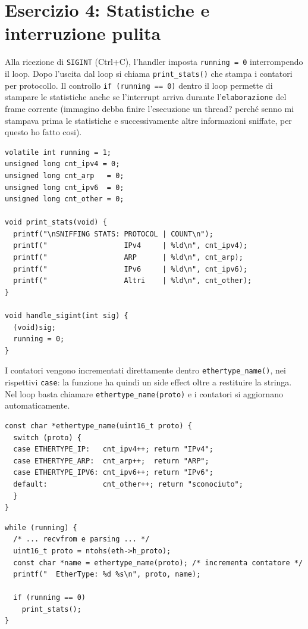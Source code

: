 \documentclass[a4paper,12pt]{article}
\begin{document}
\section{Esercizio 4: Statistiche e interruzione pulita}

Alla ricezione di \texttt{SIGINT} (Ctrl+C), l'handler imposta \texttt{running = 0}
interrompendo il loop. Dopo l'uscita dal loop si chiama \texttt{print\_stats()} che
stampa i contatori per protocollo. Il controllo \texttt{if (running == 0)} dentro il
loop permette di stampare le statistiche anche se l'interrupt arriva durante
l'\texttt{elaborazione} del frame corrente (immagino debba finire l'esecuzione
un thread? perché senno mi stampava prima le statistiche e successivamente
altre informazioni sniffate, per questo ho fatto cosi).

\begin{lstlisting}[caption={Variabili globali, handler e print\_stats()}]
volatile int running = 1;
unsigned long cnt_ipv4 = 0;
unsigned long cnt_arp   = 0;
unsigned long cnt_ipv6  = 0;
unsigned long cnt_other = 0;

void print_stats(void) {
  printf("\nSNIFFING STATS: PROTOCOL | COUNT\n");
  printf("                  IPv4     | %ld\n", cnt_ipv4);
  printf("                  ARP      | %ld\n", cnt_arp);
  printf("                  IPv6     | %ld\n", cnt_ipv6);
  printf("                  Altri    | %ld\n", cnt_other);
}

void handle_sigint(int sig) {
  (void)sig;
  running = 0;
}
\end{lstlisting}

I contatori vengono incrementati direttamente dentro \texttt{ethertype\_name()},
nei rispettivi \texttt{case}: la funzione ha quindi un side effect oltre a restituire
la stringa. Nel loop basta chiamare \texttt{ethertype\_name(proto)} e i contatori
si aggiornano automaticamente.

\begin{lstlisting}[caption={ethertype\_name() con side effect sui contatori}]
const char *ethertype_name(uint16_t proto) {
  switch (proto) {
  case ETHERTYPE_IP:   cnt_ipv4++; return "IPv4";
  case ETHERTYPE_ARP:  cnt_arp++;  return "ARP";
  case ETHERTYPE_IPV6: cnt_ipv6++; return "IPv6";
  default:             cnt_other++; return "sconociuto";
  }
}
\end{lstlisting}

\begin{lstlisting}[caption={Loop -- nessuno switch separato}]
while (running) {
  /* ... recvfrom e parsing ... */
  uint16_t proto = ntohs(eth->h_proto);
  const char *name = ethertype_name(proto); /* incrementa contatore */
  printf("  EtherType: %d %s\n", proto, name);

  if (running == 0)
    print_stats();
}
\end{lstlisting}
\end{document}
